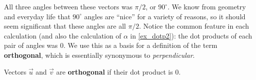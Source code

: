 All three angles between these vectors was $\pi/2$, or $90^\circ$. We know from geometry and everyday life that $90^\circ$ angles are ``nice'' for a variety of reasons, so it should seem significant that these angles are all $\pi/2$. Notice the common feature in each calculation (and also the calculation of $\alpha$ in \autoref{ex_dotp2}): the dot products of each pair of angles was 0. We use this as a basis for a definition of the term \textbf{orthogonal}, which is essentially synonymous to \emph{perpendicular}.

\begin{definition}[Orthogonal]\label{def:orthogonal}%
Vectors $\vec u$ and $\vec v$ are \textbf{orthogonal} if their dot product is 0.
\end{definition}


